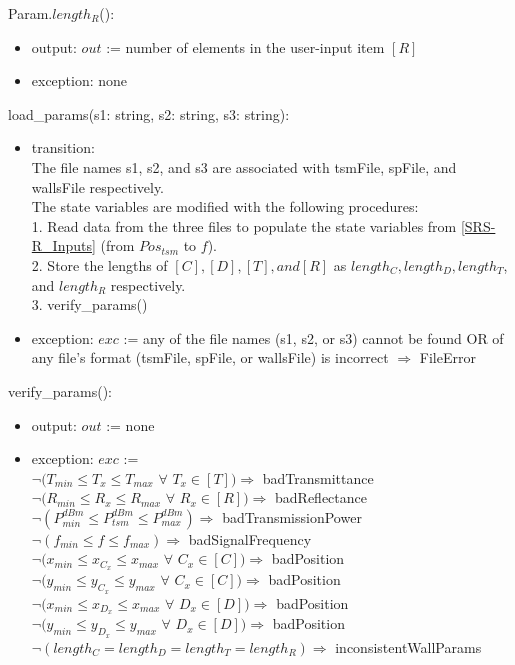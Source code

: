 \documentclass[12pt, titlepage]{article}
\begin{document}
\noindent Param.$length_R$():
\begin{itemize}
\item output: $out$ := number of elements in the user-input item $[R]$
\item exception: none
\end{itemize}

\noindent load\_params(s1: string, s2: string, s3: string):
\begin{itemize}
\item transition: \\
The file names s1, s2, and s3 are associated with tsmFile, spFile, and wallsFile respectively.\\
The state variables are modified with the following procedures:\\
1. Read data from the three files to populate the state variables from \ref{SRS-R_Inputs} (from $Pos_{tsm}$ to $f$).\\
2. Store the lengths of $[C], [D], [T], and [R]$ as $length_C, length_D, length_T$, and $length_R$ respectively. \\
3. verify\_params()\\
\item exception: $exc$ := any of the file names (s1, s2, or s3) cannot be found OR of any file's format (tsmFile, spFile, or wallsFile) is incorrect $\Rightarrow$ FileError
\end{itemize}

\noindent verify\_params():
\begin{itemize}
\item output: $out$ := none
\item exception: $exc$ := \\
$\neg(T_{min} \leq T_x \leq T_{max}$ $\forall$ $T_x \in [T]) \Rightarrow$ badTransmittance\\
$\neg(R_{min} \leq R_x \leq R_{max}$ $\forall$ $R_x \in [R]) \Rightarrow$ badReflectance\\
$\neg(P_{min}^{dBm} \leq P_{tsm}^{dBm} \leq P_{max}^{dBm}) \Rightarrow$ badTransmissionPower\\
$\neg(f_{min} \leq f \leq f_{max}) \Rightarrow$ badSignalFrequency\\
$\neg(x_{min} \leq x_{C_x} \leq x_{max}$ $\forall$ $C_x \in [C]) \Rightarrow$ badPosition\\
$\neg(y_{min} \leq y_{C_x} \leq y_{max}$ $\forall$ $C_x \in [C]) \Rightarrow$ badPosition\\
$\neg(x_{min} \leq x_{D_x} \leq x_{max}$ $\forall$ $D_x \in [D]) \Rightarrow$ badPosition\\
$\neg(y_{min} \leq y_{D_x} \leq y_{max}$ $\forall$ $D_x \in [D]) \Rightarrow$ badPosition\\
$\neg(length_C = length_D = length_T = length_R) \Rightarrow$ inconsistentWallParams\\
\end{itemize}
\end{document}
